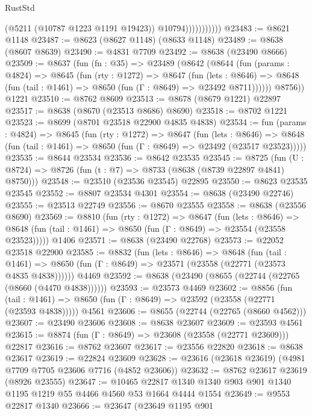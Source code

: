 \begin{lexlean}{RustStd}
\begin{coremodule}
                          (@5211 (@10787 @1223 @1191 @19423))
                          @10794)))))))))))
@23483 := @8621 @1148
@23487 := @8623 (@8627 @1148) (@8633 @1148)
@23489 := @8638 (@8607 @8639)
@23490 := @4831 @7709
@23492 := @8638 (@23490 @8666)
@23509 := @8637
    (fun (fn : @35) =>
    @23489
      (@8642
        (@8644
          (fun (params : @4824) =>
          @8645
            (fun (rty : @1272) =>
            @8647
              (fun (lets : @8646) =>
              @8648 (fun (tail : @1461) => @8650 (fun (Γ : @8649) => @23492 @8711))))))
        @8756))
    @1221
@23510 := @8762 @8609
@23513 := @8678 (@8679 @1221) @22897
@23517 := @8638 (@8670 (@23513 @8686) @8690)
@23518 := @8702 @1221
@23523 := @8699 (@8701 @23518 @22900 @4835 @4838)
@23534 := fun (params : @4824) =>
  @8645
    (fun (rty : @1272) =>
    @8647
      (fun (lets : @8646) =>
      @8648 (fun (tail : @1461) => @8650 (fun (Γ : @8649) => @23492 (@23517 @23523)))))
@23535 := @8644 @23534
@23536 := @8642 @23535
@23545 := @8725
    (fun (U : @8724) => @8726 (fun (t : @7) => @8733 (@8638 (@8739 @22897 @4841) @8750)))
@23548 := @23510 (@23536 @23545) @22895
@23550 := @8623 @23535 @23545
@23552 := @8807 @23534 @4301
@23554 := @8638 (@23490 @22746)
@23555 := @23513 @22749
@23556 := @8670 @23555
@23558 := @8638 (@23556 @8690)
@23569 := @8810
    (fun (rty : @1272) =>
    @8647
      (fun (lets : @8646) =>
      @8648 (fun (tail : @1461) => @8650 (fun (Γ : @8649) => @23554 (@23558 @23523)))))
    @1406
@23571 := @8638 (@23490 @22768)
@23573 := @22052 @23518 @22900
@23585 := @8832
    (fun (lets : @8646) =>
    @8648
      (fun (tail : @1461) =>
      @8650 (fun (Γ : @8649) => @23571 (@23558 (@22771 (@23573 @4835 @4838))))))
    @4469
@23592 := @8638 (@23490 (@8655 (@22744 (@22765 (@8660 (@4470 @4838))))))
@23593 := @23573 @4469
@23602 := @8856
    (fun (tail : @1461) => @8650 (fun (Γ : @8649) => @23592 (@23558 (@22771 (@23593 @4838)))))
    @4561
@23606 := @8655 (@22744 (@22765 (@8660 @4562)))
@23607 := @23490 @23606
@23608 := @8638 @23607
@23609 := @23593 @4561
@23615 := @8874 (fun (Γ : @8649) => @23608 (@23558 (@22771 @23609))) @22817
@23616 := @8762 @23607
@23617 := @23556 @22820
@23618 := @8638 @23617
@23619 := @22824 @23609
@23628 := @23616 (@23618 @23619) (@4981 @7709 @7705 @23606 @7716 (@4852 @23606))
@23632 := @8762 @23617 @23619 (@8926 @23555)
@23647 := @10465
    @22817
    @1340
    @1340
    @903
    @901
    @1340
    @1195
    @1219
    @55
    @4466
    @4560
    @53
    @1664
    @4444
    @1554
@23649 := @9553 @22817 @1340
@23666 := @23647
    (@23649
      @1195
      @901

\end{coremodule}
\end{lexlean}
